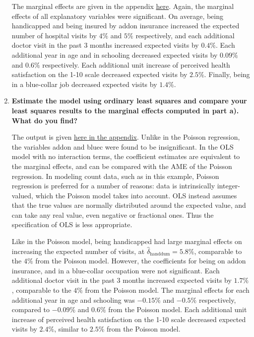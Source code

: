 \documentclass{article}
\begin{document}
\begin{enumerate}[label=(\alph*)]
The marginal effects are given in the appendix \hyperlink{margins}{here}. Again, the marginal effects of all explanatory variables were significant. On average, being handicapped and being insured by addon insurance increased the expected number of hospital visits by $4\%$ and $5\%$ respectively, and each additional doctor visit in the past 3 months increased expected visits by $0.4\%$. Each additional year in age and in schooling decreased expected visits by $0.09\%$ and $0.6\%$ respectively. Each additional unit increase of  perceived health satisfaction on the 1-10 scale decreased expected visits by $2.5\%$. Finally, being in a blue-collar job decreased expected visits by $1.4\%$.

\newpage

\item \textbf{Estimate the model using ordinary least squares and compare your least squares results to the marginal effects computed in part a). What do you find?}

The output is given \hyperlink{ols}{here in the appendix}. Unlike in the Poisson regression, the variables addon and bluec were found to be insignificant. In the OLS model with no interaction terms, the coefficient estimates are equivalent to the marginal effects, and can be compared with the AME of the Poisson regression. In modeling count data, such as in this example, Poisson regression is preferred for a number of reasons: data is intrinsically integer-valued, which the Poisson model takes into account.  OLS instead assumes that the true values are normally distributed around the expected value, and can take any real value, even negative or fractional ones. Thus the specification of OLS is less appropriate.

Like in the Poisson model, being handicapped had large marginal effects on increasing the expected number of visits, at $\hat{\delta}_{\text{handdum}} =5.8 \% $, comparable to the $4\%$ from the Poisson model. However, the coefficients for being on addon insurance, and in a blue-collar occupation were not significant. Each additional doctor visit in the past 3 months increased expected visits by $1.7\%$, comparable to the $4\%$ from the Poisson model. The marginal effects for each additional year in age and schooling was $-0.15\%$ and $-0.5\%$ respectively, compared to $-0.09\%$ and $0.6\%$ from the Poisson model. Each additional unit increase of  perceived health satisfaction on the 1-10 scale decreased expected visits by $2.4\%$, similar to $2.5\%$ from the Poisson model.\\


\end{enumerate}
\end{document}
